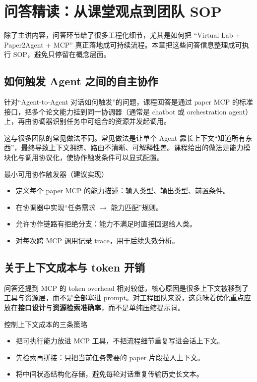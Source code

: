 \section{问答精读：从课堂观点到团队 SOP}

除了主讲内容，问答环节给了很多工程化细节，尤其是如何把 ``Virtual Lab + Paper2Agent + MCP'' 真正落地成可持续流程。本章把这些问答信息整理成可执行 SOP，避免只停留在概念层面。

\subsection{如何触发 Agent 之间的自主协作}

针对``Agent-to-Agent 对话如何触发''的问题，课程回答是通过 paper MCP 的标准接口，把多个论文能力挂到同一协调器（通常是 chatbot 或 orchestration agent）上，再由协调器识别任务中可组合的资源并发起调用。

这与很多团队的常见做法不同。常见做法是让单个 Agent 靠长上下文``知道所有东西''，最终导致上下文拥挤、路由不清晰、可解释性差。课程给出的做法是能力模块化与调用协议化，使协作触发条件可以显式配置。

\begin{knowledgebox}{最小可用协作触发器（建议实现）}
\begin{itemize}
    \item 定义每个 paper MCP 的能力描述：输入类型、输出类型、前置条件。
    \item 在协调器中实现``任务需求 $\rightarrow$ 能力匹配''规则。
    \item 允许协作链路有拒绝分支：能力不满足时直接回退给人类。
    \item 对每次跨 MCP 调用记录 trace，用于后续失效分析。
\end{itemize}
\end{knowledgebox}

\subsection{关于上下文成本与 token 开销}

问答还提到 MCP 的 token overhead 相对较低，核心原因是很多上下文被移到了工具与资源层，而不是全部塞进 prompt。对工程团队来说，这意味着优化重点应放在\textbf{接口设计}与\textbf{资源检索准确率}，而不是单纯压缩提示词。

\begin{importantbox}{控制上下文成本的三条策略}
\begin{itemize}
    \item 把可执行能力放进 MCP 工具，不把流程细节重复写进会话上下文。
    \item 先检索再拼接：只把当前任务需要的 paper 片段拉入上下文。
    \item 将中间状态结构化存储，避免每轮对话重复传输历史长文本。
\end{itemize}
\end{importantbox}

